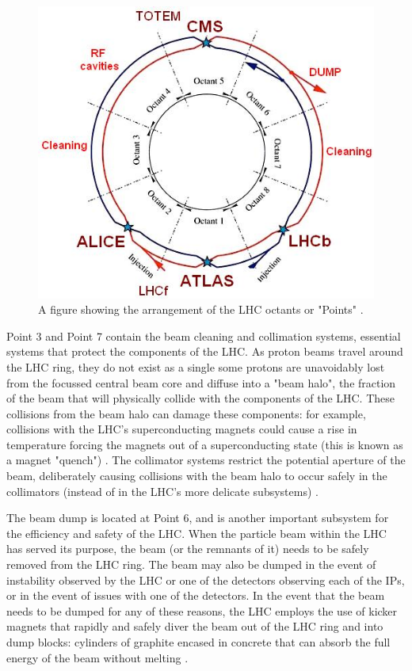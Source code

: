 \documentclass[12pt,a4paper,epsf,portrait,times,epsfig]{report}
\begin{document}
		\begin{figure}
			\centering
			\includegraphics[scale=0.5]{LHC_Octants}
			\caption{A figure showing the arrangement of the LHC octants or "Points" \cite{Evans_2008}.}
			\label{Fig:CERNOctants}
		\end{figure}

		Point 3 and Point 7 contain the beam cleaning and collimation systems, essential systems that protect the components of the LHC. As proton beams travel around the LHC ring, they do not exist as a single some protons are unavoidably lost from the focussed central beam core and diffuse into a "beam halo", the fraction of the beam that will physically collide with the components of the LHC. These collisions from the beam halo can damage these components: for example, collisions with the LHC's superconducting magnets could cause a rise in temperature forcing the magnets out of a superconducting state (this is known as a magnet "quench") \cite{LHCCollimation1}. The collimator systems restrict the potential aperture of the beam, deliberately causing collisions with the beam halo to occur safely in the collimators (instead of in the LHC's more delicate subsystems) \cite{LHCCollimation2}. \par 

		The beam dump is located at Point 6, and is another important subsystem for the efficiency and safety of the LHC. When the particle beam within the LHC has served its purpose, the beam (or the remnants of it) needs to be safely removed from the LHC ring. The beam may also be dumped in the event of instability observed by the LHC or one of the detectors observing each of the IPs, or in the event of issues with one of the detectors. In the event that the beam needs to be dumped for any of these reasons, the LHC employs the use of kicker magnets that rapidly and safely diver the beam out of the LHC ring and into dump blocks: cylinders of graphite encased in concrete that can absorb the full energy of the beam without melting \cite{LHCDesignV2}. \par 
		
\end{document}
